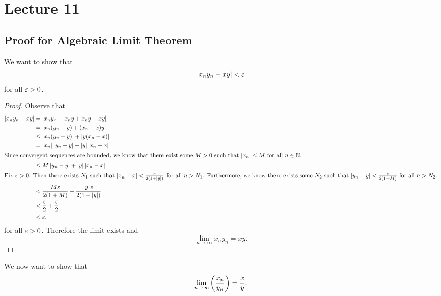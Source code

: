 \documentclass[class=article, crop=false]{standalone}
\begin{document}
  \section{Lecture 11}
  \subsection{Proof for Algebraic Limit Theorem}
  We want to show that
  \[
    \left\lvert x_ny_n - xy \right\rvert < \varepsilon
  \]
  for all $\varepsilon > 0$.
  \begin{proof}
    Observe that
    \begin{align*}
      \left\lvert x_ny_n - xy \right\rvert &= \left\lvert x_ny_n - x_ny + x_ny - xy \right\rvert \\
                        &= \left\lvert x_n(y_n - y) + (x_n - x)y \right\rvert \\
                        &\leq \left\lvert x_n(y_n - y) \right\rvert + \left\lvert y(x_n - x) \right\rvert \\
                        &= \left\lvert x_n \right\rvert\left\lvert y_n - y \right\rvert + \left\lvert y \right\rvert\left\lvert x_n - x \right\rvert \\
      \intertext{Since convergent sequences are bounded, we know that there exist some $M > 0$ such that $\left\lvert x_n \right\rvert\leq M$ for all $n\in\mathbb{N}$.}
                        &\leq M\left\lvert y_n - y \right\rvert + \left\lvert y \right\rvert\left\lvert x_n - x \right\rvert \\
      \intertext{Fix $\varepsilon > 0$. Then there exists $N_1$ such that $\left\lvert x_n - x \right\rvert < \frac{\varepsilon}{2(1 + \left\lvert y \right\rvert)}$ for all $n > N_1$. Furthermore, we know there exists some $N_2$ such that $\left\lvert y_n - y \right\rvert < \frac{\varepsilon}{2(1 + M)}$ for all $n > N_2$.}
                        &< \frac{M\varepsilon}{2(1 + M)} + \frac{\left\lvert y \right\rvert\varepsilon}{2(1 + \left\lvert y \right\rvert)} \\
                        &< \frac{\varepsilon}{2} + \frac{\varepsilon}{2} \\
                        &< \varepsilon,
    \end{align*}
    for all $\varepsilon > 0$. Therefore the limit exists and
    \[
      \lim_{n\to \infty} x_ny_n = xy.
    \]
  \end{proof}
  We now want to show that
  \[
    \lim_{n\to \infty} \left( \frac{x_n}{y_n} \right) = \frac{x}{y}.
  \]
\end{document}
